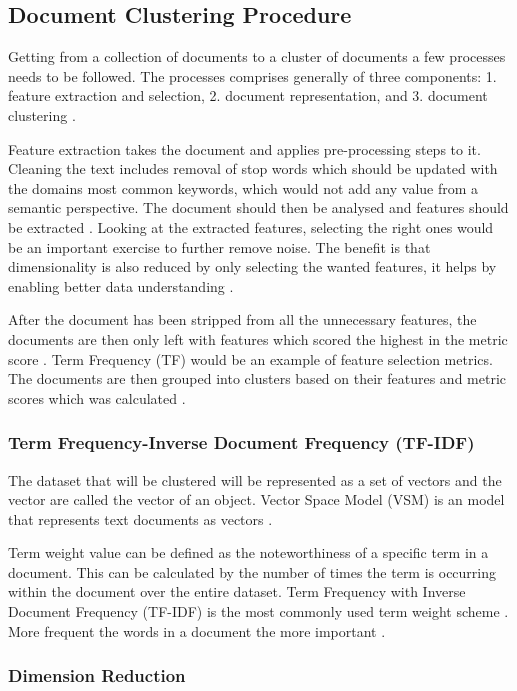 \subsection{Document Clustering Procedure}
Getting from a collection of documents to a cluster of documents a few processes needs to be followed. The processes comprises generally of three components: 1. feature extraction and selection, 2. document representation, and  3. document clustering \cite{shah2012document}.

Feature extraction takes the document and applies pre-processing steps to it. Cleaning the text includes removal of stop words which should be updated with the domains most common keywords, which would not add any value from a semantic perspective. The document should then be analysed and features should be extracted \cite{mugunthadevi2011survey}. Looking at the extracted features, selecting the right ones would be an important exercise to further remove noise. The benefit is that dimensionality is also reduced by only selecting the wanted features, it helps by enabling better data understanding \cite{wei2006combining}.

After the document has been stripped from all the unnecessary features, the documents are then only left with features which scored the highest in the metric score \cite{Shah2013}. Term Frequency (TF) would be an example of feature selection metrics. The documents are then grouped into clusters based on their features and metric scores which was calculated \cite{wei2006combining}.

\subsubsection{Term Frequency-Inverse Document Frequency (TF-IDF)}
The dataset that will be clustered will be represented as a set of vectors and the vector are called the vector of an object. Vector Space Model (VSM) is an model that represents text documents as vectors \cite{clark2015vector}. 

Term weight value can be defined as the noteworthiness of a specific term in a document. This can be calculated by the number of times the term is occurring within the document over the entire dataset. Term Frequency with Inverse Document Frequency (TF-IDF) is the most commonly used term weight scheme  \cite{cui2005document}. More frequent the words in a document the more important \cite{peng2006recent}.

\subsubsection{Dimension Reduction}

